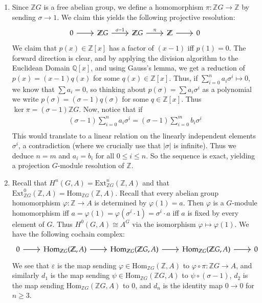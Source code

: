 \documentclass[12pt]{article}
\theoremstyle{definition}
\theoremstyle{definitionstyle}
\def\mbb#1{\mathbb{#1}}
\def\cph{\varphi}
\def\ve{\varepsilon}
\newcommand{\Z}{\mbb Z}
\newcommand{\Q}{\mbb Q}
\newcommand{\Hom}{\mathrm{Hom}}
\newcommand{\Ext}{\mathrm{Ext}}
\begin{document}
    \begin{enumerate}[label=(\alph*)]
        \item Since $\Z G$ is a free abelian group, we define a homomorphism $\pi: \Z G \to \Z$ by sending $\sigma \to 1$. We claim this yields the following projective resolution:
        \[\begin{tikzcd}
            0 & {\Z G} & {\Z G} & \Z & 0
            \arrow[from=1-1, to=1-2]
            \arrow["{\sigma-1}", from=1-2, to=1-3]
            \arrow["\pi", from=1-3, to=1-4]
            \arrow[from=1-4, to=1-5]
        \end{tikzcd}\]
        We claim that $p(x) \in \Z[x]$ has a factor of $(x-1)$ iff $p(1) = 0$. The forward direction is clear, and by applying the division algorithm to the Euclidean Domain $\Q[x]$, and using Gauss's lemma, we get a reduction of $p(x) = (x-1)q(x)$ for some $q(x) \in \Z[x]$. Thus, if $\sum_{i=0}^n a_i \sigma^i \mapsto 0$, we know that $\sum a_i = 0$, so thinking about $p(\sigma) = \sum a_i\sigma^i$ as a polynomial we write $p(\sigma) = (\sigma-1)q(\sigma)$ for some $q \in \Z[x]$. Thus $\ker \pi = (\sigma-1)\Z G$. Now, notice that if 
        \begin{align*}
            (\sigma-1)\sum_{i=0}^n a_i\sigma^i = (\sigma-1)\sum_{i=0}^m b_i\sigma^i \\
        \end{align*}
        This would translate to a linear relation on the linearly independent elements $\sigma^i$, a contradiction (where we crucially use that $|\sigma|$ is infinite). Thus we deduce $n=m$ and $a_i = b_i$ for all $0 \leq i \leq n$. So the sequence is exact, yielding a projection $G$-module resolution of $\Z$.

        \item Recall that $H^n(G, A) = \Ext^n_{\Z G}(\Z, A)$ and that $\Ext^0_{\Z G}(\Z, A) = \Hom_{\Z G}(\Z, A)$. Recall that every abelian group homomorphism $\cph: \Z \to A$ is determined by $\cph(1) = a$. Then $\cph$ is a $G$-module homomorphism iff $a = \cph(1) = \cph(\sigma^i \cdot 1) = \sigma^i \cdot a$ iff $a$ is fixed by every element of $G$. Thus $H^0(G, A) \cong A^G$ via the isomorphism $\cph \mapsto \cph(1)$. We have the following cochain complex:
        \[\begin{tikzcd}
            0 & {\Hom_{\Z G}(\Z, A)} & {\Hom_{\Z G}(\Z G, A)} & {\Hom_{\Z G}(\Z G, A)} & 0
            \arrow[from=1-1, to=1-2]
            \arrow[from=1-2, to=1-3]
            \arrow[from=1-3, to=1-4]
            \arrow[from=1-4, to=1-5]
        \end{tikzcd}\]
        We see that $\ve$ is the map sending $\cph \in \Hom_{\Z G}(\Z, A)$ to $\cph \circ \pi: \Z G \to A$, and similarly $d_1$ is the map sending $\psi \in \Hom_{\Z G}(\Z G, A)$ to $\psi \circ (\sigma-1)$, $d_2$ is the map sending $\Hom_{\Z G}(\Z G, A)$ to $0$, and $d_n$ is the identity map $0 \to 0$ for $n \geq 3$.


\end{enumerate}
\end{document}
